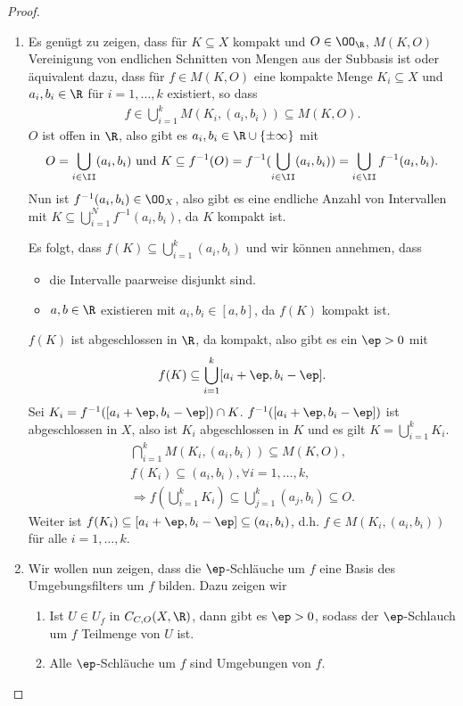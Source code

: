 \begin{proof}
\begin{enumerate}[label=\arabic{*}.)]
  \item\label{proof:2.3.17:1} Es genügt zu zeigen, dass für $K\subseteq X$
  kompakt und $O\in\OO_\R$, $M(K,O)$ Vereinigung von endlichen Schnitten von Mengen aus der Subbasis ist
  oder äquivalent dazu, dass für $f\in M(K,O)$ eine kompakte Menge $K_i\subseteq
  X$ und $a_i,b_i\in\R$ für $i=1,\ldots,k$ existiert, so dass 
  \begin{align*}f\in
  \bigcup_{i=1}^k M(K_i,(a_i,b_i))\subseteq M(K,O).
  \end{align*}
$O$ ist offen in $\R$, also gibt es $a_i,b_i\in\R\cup\{\pm\infty\}$ mit
\begin{align*}
O = \bigcup_{i\in\II} (a_i,b_i)\text{ und }K\subseteq f^{-1}(O) =
f^{-1}(\bigcup_{i\in\II}(a_i,b_i)) = \bigcup_{i\in\II} f^{-1}(a_i,b_i).
\end{align*}
Nun ist $f^{-1}(a_i,b_i)\in\OO_X$, also gibt es eine endliche Anzahl von
Intervallen mit $K\subseteq \bigcup_{i=1}^N f^{-1}(a_i,b_i)$, da $K$ kompakt
ist.

Es folgt, dass $f(K)\subseteq \bigcup_{i=1}^k (a_i,b_i)$ und wir können
annehmen, dass
\begin{itemize}
  \item die Intervalle paarweise disjunkt sind.
  \item $a,b\in\R$ existieren mit $a_i,b_i\in[a,b]$, da $f(K)$ kompakt ist.
\end{itemize}
$f(K)$ ist abgeschlossen in $\R$, da kompakt, also gibt es ein $\ep >0$ mit
\begin{align*}
f(K)\subseteq \bigcup_{i=1}^k [a_i+\ep,b_i-\ep].
\end{align*}
Sei $K_i = f^{-1}([a_i+\ep,b_i-\ep])\cap K$. $f^{-1}([a_i+\ep,b_i-\ep])$ ist
abgeschlossen in $X$, also ist $K_i$ abgeschlossen in $K$ und es gilt
$K=\bigcup_{i=1}^k K_i$.
\begin{align*}
\bigcap_{i=1}^k M(K_i,(a_i,b_i)) \subseteq M(K,O),\\
f(K_i)\subseteq (a_i,b_i), \forall i=1,\ldots,k,\\
\Rightarrow f(\bigcup_{i=1}^k K_i) \subseteq \bigcup_{j=1}^k (a_j,b_i)\subseteq
O.
\end{align*}
Weiter ist $f(K_i)\subseteq [a_i+\ep,b_i-\ep]\subseteq (a_i,b_i)$, d.h. $f\in
M(K_i,(a_i,b_i))$ für alle $i=1,\ldots,k$.
\item Wir wollen nun zeigen, dass die $\ep$-Schläuche um $f$ eine Basis
des Umgebungsfilters um $f$ bilden. Dazu zeigen wir
\begin{enumerate}[label=(\alph{*})]
  \item Ist $U\in U_f$ in $C_{C,O}(X,\R)$, dann gibt es $\ep >0$, sodass der
  $\ep$-Schlauch um $f$ Teilmenge von $U$ ist.
  \item Alle $\ep$-Schläuche um $f$ sind Umgebungen von $f$.
\end{enumerate}


\end{enumerate}
\end{proof}

